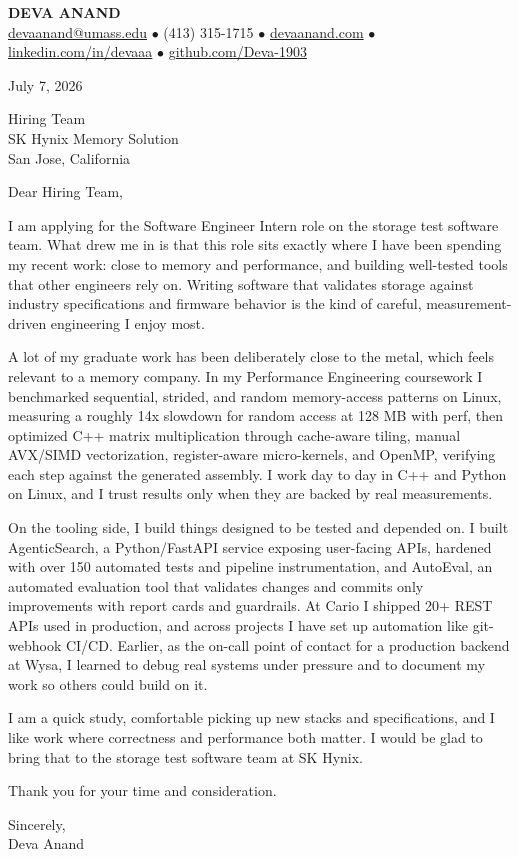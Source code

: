 \documentclass[letterpaper,11pt]{article}
\begin{document}
\begin{center}
    {\fontsize{18}{20}\selectfont\bfseries DEVA ANAND}\\ \vspace{3pt}
    {\small
    \href{mailto:devaanand@umass.edu}{devaanand@umass.edu}
    \enspace$\bullet$\enspace
    (413) 315-1715
    \enspace$\bullet$\enspace
    \href{https://devaanand.com}{devaanand.com}
    \enspace$\bullet$\enspace
    \href{https://linkedin.com/in/devaaa/}{linkedin.com/in/devaaa}
    \enspace$\bullet$\enspace
    \href{https://github.com/Deva-1903}{github.com/Deva-1903}}
\end{center}

\vspace{6pt}

July 7, 2026

Hiring Team \\
SK Hynix Memory Solution \\
San Jose, California

\vspace{2pt}

Dear Hiring Team,

I am applying for the Software Engineer Intern role on the storage test software team. What drew me in is that this role sits exactly where I have been spending my recent work: close to memory and performance, and building well-tested tools that other engineers rely on. Writing software that validates storage against industry specifications and firmware behavior is the kind of careful, measurement-driven engineering I enjoy most.

A lot of my graduate work has been deliberately close to the metal, which feels relevant to a memory company. In my Performance Engineering coursework I benchmarked sequential, strided, and random memory-access patterns on Linux, measuring a roughly 14x slowdown for random access at 128 MB with perf, then optimized C++ matrix multiplication through cache-aware tiling, manual AVX/SIMD vectorization, register-aware micro-kernels, and OpenMP, verifying each step against the generated assembly. I work day to day in C++ and Python on Linux, and I trust results only when they are backed by real measurements.

On the tooling side, I build things designed to be tested and depended on. I built AgenticSearch, a Python/FastAPI service exposing user-facing APIs, hardened with over 150 automated tests and pipeline instrumentation, and AutoEval, an automated evaluation tool that validates changes and commits only improvements with report cards and guardrails. At Cario I shipped 20+ REST APIs used in production, and across projects I have set up automation like git-webhook CI/CD. Earlier, as the on-call point of contact for a production backend at Wysa, I learned to debug real systems under pressure and to document my work so others could build on it.

I am a quick study, comfortable picking up new stacks and specifications, and I like work where correctness and performance both matter. I would be glad to bring that to the storage test software team at SK Hynix.

Thank you for your time and consideration.

\vspace{6pt}

Sincerely, \\
Deva Anand
\end{document}
